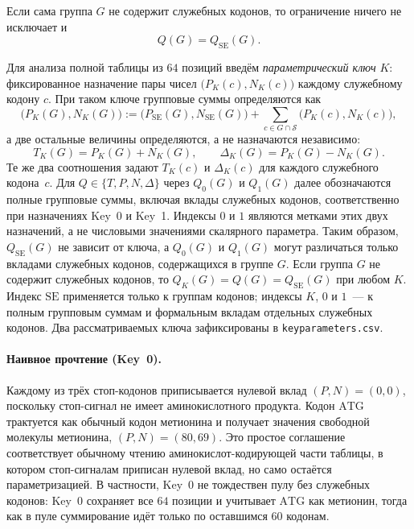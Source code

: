 \documentclass[11pt,a4paper]{article}
\renewcommand{\_}{\origunderscore\allowbreak}
\begin{document}
Если сама группа $G$ не содержит служебных кодонов, то ограничение
ничего не исключает и
\[
Q(G)=Q_{\mathrm{SE}}(G).
\]

Для анализа полной таблицы из $64$ позиций введём
\emph{параметрический ключ} $K$: фиксированное назначение пары чисел
$\bigl(P_K(c),N_K(c)\bigr)$ каждому служебному кодону $c$.
При таком ключе групповые суммы определяются как
\[
\bigl(P_K(G),N_K(G)\bigr)
:=
\bigl(P_{\mathrm{SE}}(G),N_{\mathrm{SE}}(G)\bigr)
+
\sum_{c\in G\cap\mathcal{S}}
\bigl(P_K(c),N_K(c)\bigr),
\]
а две остальные величины определяются, а не назначаются независимо:
\[
T_K(G)=P_K(G)+N_K(G),
\qquad
\Delta_K(G)=P_K(G)-N_K(G).
\]
Те же два соотношения задают $T_K(c)$ и $\Delta_K(c)$ для каждого
служебного кодона~$c$.
Для $Q\in\{T,P,N,\Delta\}$ через $Q_0(G)$ и $Q_1(G)$ далее
обозначаются полные групповые суммы, включая вклады служебных кодонов,
соответственно при назначениях Key~0 и Key~1. Индексы $0$ и $1$
являются метками этих двух назначений, а не числовыми значениями
скалярного параметра. Таким образом, $Q_{\mathrm{SE}}(G)$ не зависит
от ключа, а $Q_0(G)$ и $Q_1(G)$ могут различаться только вкладами
служебных кодонов, содержащихся в группе $G$. Если группа $G$ не
содержит служебных кодонов, то
$Q_K(G)=Q(G)=Q_{\mathrm{SE}}(G)$ при любом $K$. Индекс
$\mathrm{SE}$ применяется только к группам кодонов; индексы $K$, $0$
и $1$~--- к полным групповым суммам и формальным вкладам отдельных
служебных кодонов. Два рассматриваемых ключа зафиксированы в
\texttt{key\_parameters.csv}.

\paragraph{Наивное прочтение (Key~0).}
Каждому из трёх стоп-кодонов приписывается нулевой вклад
$(P,N)=(0,0)$, поскольку стоп-сигнал не имеет аминокислотного продукта.
Кодон $\mathrm{ATG}$ трактуется как обычный кодон метионина и получает
значения свободной молекулы метионина,
$(P,N)=(80,69)$. Это простое соглашение соответствует обычному чтению
аминокислот-кодирующей части таблицы, в котором стоп-сигналам
приписан нулевой вклад, но само остаётся параметризацией. В частности,
Key~0 не тождествен пулу без служебных кодонов: Key~0 сохраняет все
$64$ позиции и учитывает $\mathrm{ATG}$ как метионин, тогда как в пуле
суммирование идёт только по оставшимся $60$ кодонам.
\end{document}
